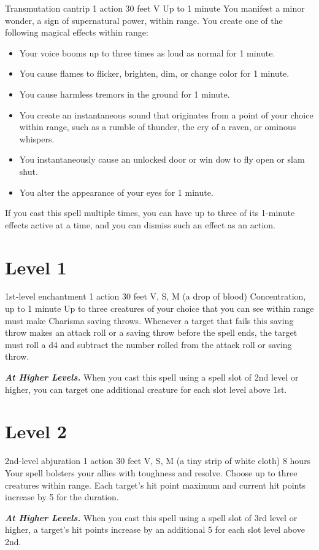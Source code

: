 \documentclass[10pt,twoside,twocolumn,openany]{book}
\begin{document}
{Transmutation cantrip}
{\color{action} 1 action}
{30 feet}
{V}
{Up to 1 minute}
%
You manifest a minor wonder, a sign of supernatural power, within range. You create one of the following magical effects within range:
\begin{itemize}
	\item Your voice booms up to three times as loud as normal for 1 minute.
	\item You cause flames to flicker, brighten, dim, or change color for 1 minute.
	\item You cause harmless tremors in the ground for 1 minute.
	\item You create an instantaneous sound that originates from a point of your choice within range, such as a rumble of thunder, the cry of a raven, or ominous whispers.
	\item You instantaneously cause an unlocked door or win  dow to fly open or slam shut.
	\item You alter the appearance of your eyes for 1 minute.
\end{itemize}
If you cast this spell multiple times, you can have up to three of its 1-minute effects active at a time, and you can dismiss such an effect as an action.

\newpage
\section{Level 1}
{1st-level enchantment}
{\color{action} 1 action}
{30 feet}
{V, S, M (a drop of blood)}
{Concentration, up to 1 minute}
%
Up to three creatures of your choice that you can see within range must make Charisma saving throws. Whenever a target that fails this saving throw makes an attack roll or a saving throw before the spell ends, the target must roll a d4 and subtract the number rolled from the attack roll or saving throw.

\textbf{\textit{At Higher Levels.}} When you cast this spell using a spell slot of 2nd level or higher, you can target one additional creature for each slot level above 1st.

\newpage
\section{Level 2}
{2nd-level abjuration}
{\color{action}1 action}
{30 feet}
{V, S, M (a tiny strip of white cloth)}
{8 hours}
%
Your spell bolsters your allies with toughness and resolve. Choose up to three creatures within range. Each target's hit point maximum and current hit points increase by 5 for the duration.

\textbf{\textit{At Higher Levels.}} When you cast this spell using
a spell slot of 3rd level or higher, a target's hit points increase by an additional 5 for each slot level above 2nd.
\end{document}
